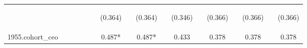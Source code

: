 \begin{center}
\begin{tabular}{lcccccccccccccccc}
\vspace{4pt} & \begin{footnotesize}\end{footnotesize} & \begin{footnotesize}\end{footnotesize} & \begin{footnotesize}\end{footnotesize} & \begin{footnotesize}\end{footnotesize} & \begin{footnotesize}\end{footnotesize} & \begin{footnotesize}(0.364)\end{footnotesize} & \begin{footnotesize}\end{footnotesize} & \begin{footnotesize}(0.364)\end{footnotesize} & \begin{footnotesize}\end{footnotesize} & \begin{footnotesize}(0.346)\end{footnotesize} & \begin{footnotesize}\end{footnotesize} & \begin{footnotesize}(0.366)\end{footnotesize} & \begin{footnotesize}\end{footnotesize} & \begin{footnotesize}(0.366)\end{footnotesize} & \begin{footnotesize}\end{footnotesize} & \begin{footnotesize}(0.366)\end{footnotesize} \\
1955.cohort\_ceo &  &  &  &  &  & 0.487* &  & 0.487* &  & 0.433 &  & 0.378 &  & 0.378 &  & 0.378 \\

\end{tabular}
\end{center}
